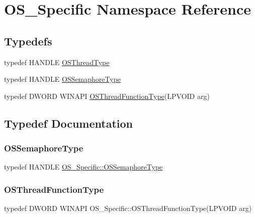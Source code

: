 \hypertarget{namespace_o_s___specific}{}\section{O\+S\+\_\+\+Specific Namespace Reference}
\label{namespace_o_s___specific}
\subsection*{Typedefs}
\begin{DoxyCompactItemize}
\item 
typedef H\+A\+N\+D\+LE \hyperlink{namespace_o_s___specific_a965d89d27f3b632fa8d2d1b593bf2bd6}{O\+S\+Thread\+Type}
\item 
typedef H\+A\+N\+D\+LE \hyperlink{namespace_o_s___specific_a11a242d06d0e59bcf9525303bd7b3b57}{O\+S\+Semaphore\+Type}
\item 
typedef D\+W\+O\+RD W\+I\+N\+A\+PI \hyperlink{namespace_o_s___specific_a4a422b5e92e59f05440b9f9439cd349d}{O\+S\+Thread\+Function\+Type}(L\+P\+V\+O\+ID arg)
\end{DoxyCompactItemize}


\subsection{Typedef Documentation}
\mbox{\label{namespace_o_s___specific_a11a242d06d0e59bcf9525303bd7b3b57}} 
\subsubsection{\texorpdfstring{O\+S\+Semaphore\+Type}{OSSemaphoreType}}
{\footnotesize\ttfamily typedef H\+A\+N\+D\+LE \hyperlink{namespace_o_s___specific_a11a242d06d0e59bcf9525303bd7b3b57}{O\+S\+\_\+\+Specific\+::\+O\+S\+Semaphore\+Type}}

\mbox{\label{namespace_o_s___specific_a4a422b5e92e59f05440b9f9439cd349d}} 
\subsubsection{\texorpdfstring{O\+S\+Thread\+Function\+Type}{OSThreadFunctionType}}
{\footnotesize\ttfamily typedef D\+W\+O\+RD W\+I\+N\+A\+PI O\+S\+\_\+\+Specific\+::\+O\+S\+Thread\+Function\+Type(L\+P\+V\+O\+ID arg)}

